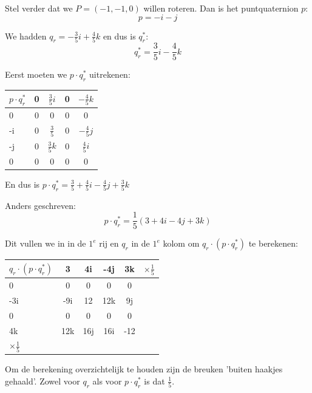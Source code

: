  Stel verder dat we $P=(-1,-1,0)$ willen roteren. Dan is het puntquaternion $p$:
\[p = -i-j\]
	
We hadden $q_r = -\frac{3}{5}i+\frac{4}{5}k$ en dus is $q^*_r$:
\[
  q^*_r = \frac{3}{5}i - \frac{4}{5}k
\]
	
Eerst moeten we $p\cdot q^*_r$ uitrekenen:
\begin{center}
	\begin{tabular}{ | l || c | c |c |c |}
		\hline
		$ p\cdot q^*_r $  & 0 & $  \frac{3}{5}i  $  & 0 & $ - \frac{4}{5}k $  \\ \hline \hline
		0                 & 0 & 0                   & 0 & 0  \\ \hline
		-i                & 0 &  $  \frac{3}{5}  $  & 0 & $ - \frac{4}{5}j $\\ \hline
		-j                & 0 &  $  \frac{3}{5}k $  & 0 & $  \frac{4}{5}i $\\ \hline
		0                 & 0 & 0                   & 0 & 0 \\
		\hline 
	\end{tabular}
\end{center}

En dus is $p\cdot q^*_r = \frac{3}{5} + \frac{4}{5}i - \frac{4}{5}j + \frac{3}{5}k$

Anders geschreven:
\[
    p\cdot q^*_r = \frac{1}{5}(3 + 4i - 4j  + 3k)
\]

Dit vullen we in in de $1^e$ rij en $q_r$ in de $1^e$ kolom om $q_r\cdot (p\cdot q^*_r)$ te berekenen:
\begin{center}
	\begin{tabular}{ | l || c | c | c | c |l}
		\hline
$ q_r\cdot (p\cdot q^*_r) $  & 3   & 4i  & -4j & 3k  &  $ \times  \frac{1}{5} $\\ \hline \hline
		0                    & 0   & 0   & 0   & 0   & \\ \hline
		-3i                  & -9i & 12  & 12k & 9j  & \\ \hline
		0                    & 0   & 0   & 0   & 0   & \\ \hline
		4k                   & 12k & 16j & 16i & -12 & \\ 
		\hline 
		$ \times  \frac{1}{5} $
	\end{tabular}
\end{center}
Om de berekening overzichtelijk te houden zijn de breuken 'buiten haakjes gehaald'. Zowel voor $q_r$ als voor $p\cdot q^*_r$ is dat $\frac{1}{5}$. 

